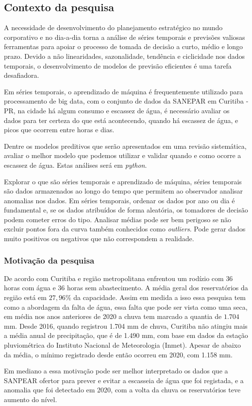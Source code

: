 \subsection{Contexto da pesquisa} \label{subsec:contexto}
 A necessidade de desenvolvimento do planejamento estratégico no mundo corporativo e no dia-a-dia torna a análise de séries temporais e previsões valiosas ferramentas para apoiar o processo de tomada de decisão a curto, médio e longo prazo. Devido a não linearidades, sazonalidade, tendência e ciclicidade nos dados temporais, o desenvolvimento de modelos de previsão eficientes é uma tarefa desafiadora. 

 Em séries temporais, o aprendizado de máquina é frequentemente utilizado para processamento de big data, com o conjunto de dados da SANEPAR em Curitiba - PR, na cidade há algum consumo e escassez de água, é necessário avaliar os dados para ter certeza do que está acontecendo, quando há escassez de água, e picos que ocorrem entre horas e dias.
 
 Dentre os modelos preditivos que serão apresentados em uma revisão sistemática, avaliar o melhor modelo que podemos utilizar e validar quando e como ocorre a escassez de água. Estas análises será em \textit{python}.
 
 Explorar o que são séries temporais e aprendizado de máquina, séries temporais são dados armazenados ao longo do tempo que permitem ao observador analisar anomalias nos dados. Em séries temporais, ordenar os dados por ano ou dia é fundamental e, se os dados atribuídos de forma aleatória, os tomadores de decisão podem cometer erros do tipo. 
 Analisar médias pode ser bem perigoso se não excluir pontos fora da curva também conhecidos como \textit{outliers}. Pode gerar dados muito positivos ou negativos que não correspondem a realidade.
   
      
\subsubsection{Motiva\c c\~ao da pesquisa} \label{subsubsec:motivacao}
    
    De acordo com \cite{vasconcelos_2020} Curitiba e região metropolitana enfrentou um rodízio com $36$ horas com água e $36$ horas sem abastecimento. A média geral dos reservatórios da região está em $27,96\%$ da capacidade. Assim em medida a isso essa pesquisa tem como a abordagem da falta de água, essa falta que pode ser vista como uma seca, em média nos anos anteriores de 2020 a chuva tem marcado a quantia de $1.704$ mm. \cite{vasconcelos_2020} Desde 2016, quando registrou 1.704 mm de chuva, Curitiba não atingiu mais a média anual de precipitação, que é de 1.490 mm, com base em dados da estação pluviométrica do Instituto Nacional de Meteorologia (Inmet).  Apesar de abaixo da média, o mínimo registrado desde então ocorreu em 2020, com 1.158 mm.
    
    Em mediano a essa motivação pode ser melhor interpretado os dados que a SANPEAR ofertor para prever e evitar a escasseia de água que foi registada, e a anomalia que foi detectado em 2020, com a volta da chuva os reservatórios teve aumento do nível.
    